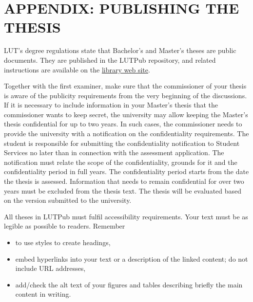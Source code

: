 \chapter{APPENDIX: PUBLISHING THE THESIS}
LUT’s degree regulations state that Bachelor's and Master's theses are public documents. They are published in the LUTPub repository, and related instructions are available on the \href{https://libguides.lut.fi/lutpub-en}{\color{blue} \underline{library web site}}.

Together with the first examiner, make sure that the commissioner of your thesis is aware of the publicity requirements from the very beginning of the discussions. If it is necessary to include information in your Master’s thesis that the commissioner wants to keep secret, the university may allow keeping the Master’s thesis confidential for up to two years. In such cases, the commissioner needs to provide the university with a notification on the confidentiality requirements. The student is responsible for submitting the confidentiality notification to Student Services no later than in connection with the assessment application. The notification must relate the scope of the confidentiality, grounds for it and the confidentiality period in full years. The confidentiality period starts from the date the thesis is assessed. Information that needs to remain confidential for over two years must be excluded from the thesis text. The thesis will be evaluated based on the version submitted to the university.

All theses in LUTPub must fulfil accessibility requirements. Your text must be as legible as possible to readers. Remember

\begin{itemize}[noitemsep]
	\item to use styles to create headings,
	\item embed hyperlinks into your text or a description of the linked content; do not include URL addresses,
	\item add/check the alt text of your figures and tables describing briefly the main content in writing.
\end{itemize}